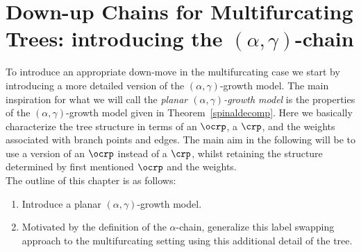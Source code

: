 \chapter{Down-up Chains for Multifurcating Trees: introducing the $(\alpha, \gamma)$-chain}\label{ch:downupmultifurcating}

To introduce an appropriate down-move in the multifurcating case we start by introducing a more detailed version of the $(\alpha, \gamma)$-growth model.
The main inspiration for what we will call the \textit{planar $(\alpha, \gamma)$-growth model} is the properties of the $(\alpha, \gamma)$-growth model given in Theorem~\ref{spinaldecomp}.
Here we basically characterize the tree structure in terms of an $\ocrp$, a $\crp$, and the weights associated with branch points and edges.
The main aim in the following will be to use a version of an $\ocrp$ instead of a $\crp$, whilst retaining the structure determined by first mentioned $\ocrp$ and the weights.\\

\noindent
The outline of this chapter is as follows:
%
\begin{enumerate}
  \item Introduce a planar $(\alpha, \gamma)$-growth model.
  \item Motivated by the definition of the $\alpha$-chain, generalize this label swapping approach to the multifurcating setting using this additional detail of the tree.
\end{enumerate}

